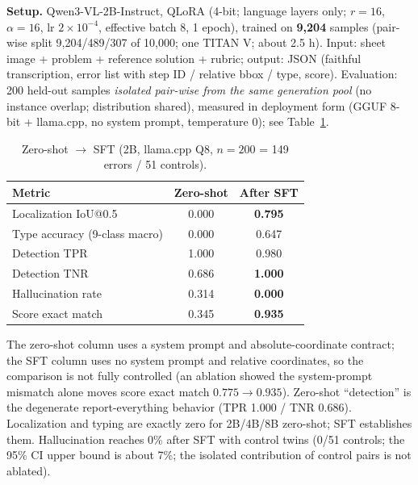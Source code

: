 \documentclass[11pt]{article}
\begin{document}
\textbf{Setup.} Qwen3-VL-2B-Instruct, QLoRA (4-bit; language layers only; $r{=}16$, $\alpha{=}16$, lr $2{\times}10^{-4}$, effective batch 8, 1 epoch), trained on \textbf{9{,}204} samples (pair-wise split 9{,}204/489/307 of 10{,}000; one TITAN V; about 2.5 h). Input: sheet image + problem + reference solution + rubric; output: JSON (faithful transcription, error list with step ID / relative bbox / type, score). Evaluation: 200 held-out samples \emph{isolated pair-wise from the same generation pool} (no instance overlap; distribution shared), measured in deployment form (GGUF 8-bit + llama.cpp, no system prompt, temperature 0); see Table~\ref{tab:sft}.

\begin{table}[t]\centering\small
\caption{Zero-shot $\rightarrow$ SFT (2B, llama.cpp Q8, $n{=}200$ = 149 errors / 51 controls).}\label{tab:sft}
\begin{tabular}{lcc}\toprule
Metric & Zero-shot & After SFT\\\midrule
Localization IoU@0.5 & 0.000 & \textbf{0.795}\\
Type accuracy (9-class macro) & 0.000 & 0.647\\
Detection TPR & 1.000 & 0.980\\
Detection TNR & 0.686 & \textbf{1.000}\\
Hallucination rate & 0.314 & \textbf{0.000}\\
Score exact match & 0.345 & \textbf{0.935}\\\bottomrule
\end{tabular}
\end{table}

The zero-shot column uses a system prompt and absolute-coordinate contract; the SFT column uses no system prompt and relative coordinates, so the comparison is not fully controlled (an ablation showed the system-prompt mismatch alone moves score exact match $0.775\rightarrow0.935$). Zero-shot ``detection'' is the degenerate report-everything behavior (TPR 1.000 / TNR 0.686). Localization and typing are exactly zero for 2B/4B/8B zero-shot; SFT establishes them. Hallucination reaches 0\% after SFT with control twins (0/51 controls; the 95\% CI upper bound is about 7\%; the isolated contribution of control pairs is not ablated).
\end{document}
